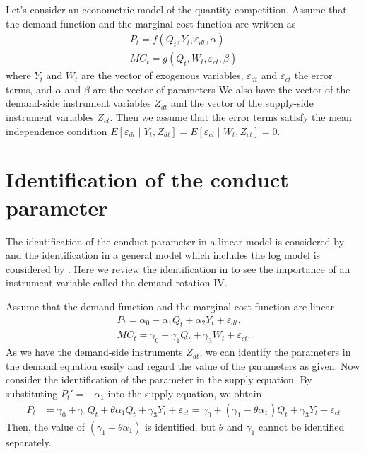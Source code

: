 \documentclass[11pt, a4paper]{article}
\begin{document}
Let's consider an econometric model of the quantity competition.
Assume that the demand function and the marginal cost function are written as 
\begin{align}
    P_t = f(Q_t, Y_t, \varepsilon_{dt}, \alpha)\\
    MC_t = g(Q_t, W_t, \varepsilon_{ct}, \beta)
\end{align}
where $Y_t$ and $W_t$ are the vector of exogenous variables, $\varepsilon_{dt}$ and $\varepsilon_{ct}$ the error terms, and $\alpha$ and $\beta$ are the vector of parameters
We also have the vector of the demand-side instrument variables $Z_{dt}$ and the vector of the supply-side instrument variables $Z_{ct}$.
Then we assume that the error terms satisfy the mean independence condition $E[\varepsilon_{dt}\mid Y_t, Z_{dt}] = E[\varepsilon_{ct} \mid W_t, Z_{ct}] =0$.


\section{Identification of the conduct parameter}
The identification of the conduct parameter in a linear model is considered by \cite{bresnahan1982oligopoly} and the identification in a general model which includes the log model is considered by \cite{lau1982identifying}.
Here we review the identification in \cite{bresnahan1982oligopoly} to see the importance of an instrument variable called the demand rotation IV.

Assume that the demand function and the marginal cost function are linear
\begin{align}
    P_{t}=\alpha_0 - \alpha_1 Q_{t} + \alpha_2 Y_t + \varepsilon_{dt},\\
    MC_{t} = \gamma_0 + \gamma_1 Q_t + \gamma_3 W_t + \varepsilon_{ct}.
\end{align}
As we have the demand-side instruments $Z_{dt}$, we can identify the parameters in the demand equation easily and regard the value of the parameters as given.
Now consider the identification of the parameter in the supply equation.
By substituting $P_t'= - \alpha_1$ into the supply equation, we obtain
\begin{align}
    P_{t}&=\gamma_0+\gamma_1 Q_t + \theta\alpha_1 Q_t + \gamma_3 Y_t + \varepsilon_{ct} =\gamma_0+\left(\gamma_1- \theta\alpha_1\right) Q_t + \gamma_3 Y_t + \varepsilon_{ct} 
\end{align}
Then, the value of $(\gamma_1- \theta\alpha_1)$ is identified, but $\theta$ and $\gamma_1$ cannot be identified separately.
\end{document}

